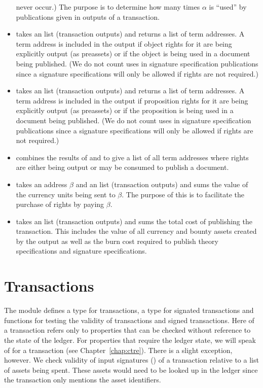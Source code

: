 \begin{itemize}
never occur.)
The purpose is to determine how many times $\alpha$ is ``used'' by publications
given in outputs of a transaction.
\item {} takes an {} list (transaction outputs)
and returns a list of term addresses.
A term address is included in the output if
object rights for it are being explicitly output
(as {} preassets)
or if the object is being used in a document being published.
(We do not count uses in signature specification publications since
a signature specifications will only be allowed if rights are not required.)
\item {} takes an {} list (transaction outputs)
and returns a list of term addresses.
A term address is included in the output if
proposition rights for it are being explicitly output
(as {} preassets)
or if the proposition is being used in a document being published.
(We do not count uses in signature specification publications since
a signature specifications will only be allowed if rights are not required.)
\item {} combines the results of {}
and {} to give a list of all term addresses
where rights are either being output or may be consumed to publish a document.
\item {} takes an address $\beta$
and an {} list (transaction outputs)
and sums the value of the currency units being sent to $\beta$.
The purpose of this is to facilitate the purchase of rights by paying $\beta$.
\item {} takes an {} list (transaction outputs)
and sums the total cost of publishing the transaction.
This includes the value of all currency and bounty assets created by the output
as well as the burn cost required to publish theory specifications
and signature specifications.
\end{itemize}

\section{Transactions}

The module  defines a type {} for transactions,
a type {} for signated transactions
and functions for testing the validity of transactions and signed transactions.
Here {} of a transaction refers only to properties that
can be checked without reference to the state of the ledger.
For properties that require the ledger state, we will speak of {}
for a transaction (see Chapter~\ref{chap:ctre}).
There is a slight exception, however. We check validity of input signatures 
({}) of
a transaction relative to a list of assets being spent.
These assets would need to be looked up in the ledger
since the transaction only mentions the asset identifiers.

